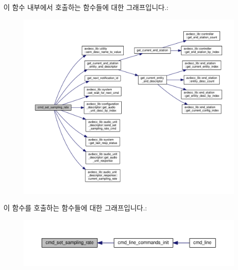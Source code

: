 이 함수 내부에서 호출하는 함수들에 대한 그래프입니다.\+:
\nopagebreak
\begin{figure}[H]
\begin{center}
\leavevmode
\includegraphics[width=350pt]{classcmd__line_af21cc234e95dba0e6c646e1ca67b57ad_cgraph}
\end{center}
\end{figure}




이 함수를 호출하는 함수들에 대한 그래프입니다.\+:
\nopagebreak
\begin{figure}[H]
\begin{center}
\leavevmode
\includegraphics[width=350pt]{classcmd__line_af21cc234e95dba0e6c646e1ca67b57ad_icgraph}
\end{center}
\end{figure}


